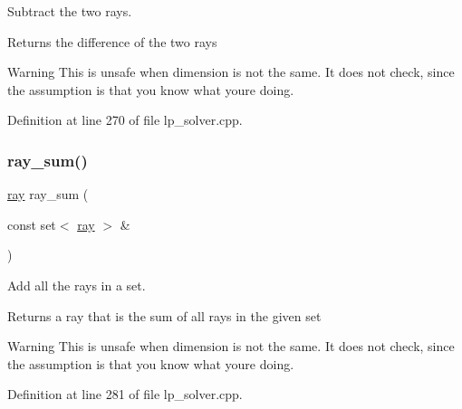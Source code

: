 Subtract the two rays. 

\begin{DoxyReturn}{Returns}
the difference of the two rays 
\end{DoxyReturn}
\begin{DoxyWarning}{Warning}
This is unsafe when dimension is not the same. It does not check, since the assumption is that you know what you\textquotesingle{}re doing. 
\end{DoxyWarning}


Definition at line 270 of file lp\+\_\+solver.\+cpp.

\mbox{\label{group___c_l_s_solvers_gafb95c2b09dc0a5ea693a99cb8340ff28}} 
\subsubsection{\texorpdfstring{ray\+\_\+sum()}{ray\_sum()}}
{\footnotesize\ttfamily \hyperlink{group___c_l_s_solvers_classray}{ray} ray\+\_\+sum (\begin{DoxyParamCaption}\item[{const set$<$ \hyperlink{group___c_l_s_solvers_classray}{ray} $>$ \&}]{ }\end{DoxyParamCaption})}



Add all the rays in a set. 

\begin{DoxyReturn}{Returns}
a ray that is the sum of all rays in the given set 
\end{DoxyReturn}
\begin{DoxyWarning}{Warning}
This is unsafe when dimension is not the same. It does not check, since the assumption is that you know what you\textquotesingle{}re doing. 
\end{DoxyWarning}


Definition at line 281 of file lp\+\_\+solver.\+cpp.

\mbox{\label{group___c_l_s_solvers_ga2b6dbec1643b53f8e613b0a3de07f3ce}} 
